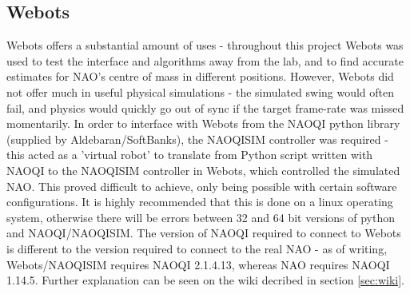 \documentclass[11pt]{article}
\newcommand*\ruleline[1]{\par\noindent\raisebox{.8ex}{\makebox[\linewidth]{\hrulefill\hspace{1ex}\raisebox{-.8ex}{#1}\hspace{1ex}\hrulefill}}}
\begin{document}
\subsection{Webots}
\ruleline{James Doering}
Webots offers a substantial amount of uses - throughout this project Webots was used to test the interface and algorithms away from the lab, and to find accurate estimates for NAO's centre of mass in different positions. However, Webots did not offer much in useful physical simulations - the simulated swing would often fail, and physics would quickly go out of sync if the target frame-rate was missed momentarily. In order to interface with Webots from the NAOQI python library (supplied by Aldebaran/SoftBanks), the NAOQISIM controller was required - this acted as a 'virtual robot' to translate from Python script written with NAOQI to the NAOQISIM controller in Webots, which controlled the simulated NAO. This proved difficult to achieve, only being possible with certain software configurations. It is highly recommended that this is done on a linux operating system, otherwise there will be errors between 32 and 64 bit versions of python and NAOQI/NAOQISIM. The version of NAOQI required to connect to Webots is different to the version required to connect to the real NAO - as of writing, Webots/NAOQISIM requires NAOQI 2.1.4.13, whereas NAO requires NAOQI 1.14.5. Further explanation can be seen on the wiki decribed in section \ref{sec:wiki}.



\end{document}
